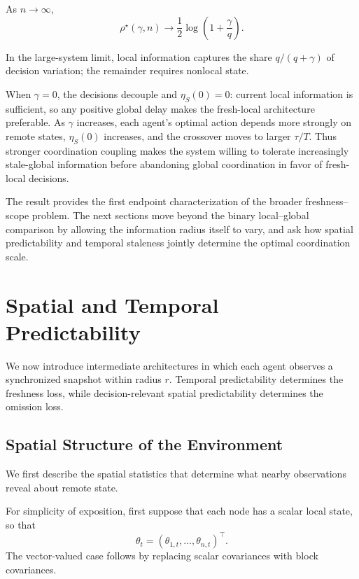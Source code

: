 \documentclass[11pt]{article}
\begin{document}
As $n\rightarrow\infty$,
\begin{equation}
    \boxed{
    \rho^\star(\gamma,n)
    \longrightarrow
    \frac{1}{2}
    \log
    \left(
        1+\frac{\gamma}{q}
    \right).
    }
    \label{eq:large_n_threshold}
\end{equation}

In the large-system limit, local information captures the share
$q/(q+\gamma)$ of decision variation; the remainder requires nonlocal state.

When $\gamma=0$, the decisions decouple and
$\eta_S(0)=0$: current local information is sufficient, so any
positive global delay makes the fresh-local architecture preferable. As $\gamma$
increases, each agent's optimal action depends more strongly on remote states,
$\eta_S(0)$ increases, and the crossover moves to larger
$\tau/T$. Thus stronger coordination coupling makes the system willing to
tolerate increasingly stale-global information before abandoning global
coordination in favor of fresh-local decisions.

The result provides the first endpoint characterization of the broader
freshness--scope problem. The next sections move beyond the binary
local--global comparison by allowing the information radius itself to vary,
and ask how spatial predictability and temporal staleness jointly determine
the optimal coordination scale.

\section{Spatial and Temporal Predictability}
\label{sec:spatiotemporal_predictability}

We now introduce intermediate architectures in which each agent observes a
synchronized snapshot within radius $r$. Temporal predictability determines
the freshness loss, while decision-relevant spatial predictability determines
the omission loss.

\subsection{Spatial Structure of the Environment}
\label{subsec:spatial_structure}

We first describe the spatial statistics that determine what nearby
observations reveal about remote state.

For simplicity of exposition, first suppose that each node has a scalar local
state, so that
\[
    \theta_t
    =
    (\theta_{1,t},\ldots,\theta_{n,t})^\top.
\]
The vector-valued case follows by replacing scalar covariances with block
covariances.
\end{document}

